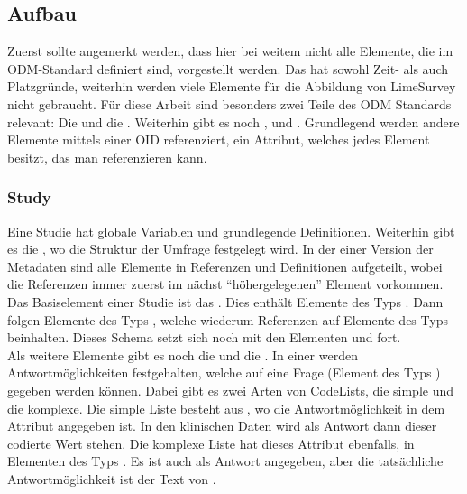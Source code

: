 \subsection{Aufbau}

Zuerst sollte angemerkt werden, dass hier bei weitem nicht alle Elemente, die im ODM-Standard definiert sind, vorgestellt werden. Das hat sowohl Zeit- als auch Platzgründe, weiterhin werden viele Elemente für die Abbildung von LimeSurvey nicht gebraucht.
Für diese Arbeit sind besonders zwei Teile des ODM Standards relevant: Die  und die .
Weiterhin gibt es noch ,  und .
Grundlegend werden andere Elemente mittels einer OID referenziert, ein Attribut, welches jedes Element besitzt, das man referenzieren kann.

\subsubsection{Study}

Eine Studie hat globale Variablen und grundlegende Definitionen.
Weiterhin gibt es die , wo die Struktur der Umfrage festgelegt wird.
In der einer Version der Metadaten sind alle Elemente in Referenzen und Definitionen aufgeteilt, wobei die Referenzen immer zuerst im nächst \enquote{höhergelegenen} Element vorkommen.\\

Das Basiselement einer Studie ist das .
Dies enthält Elemente des Typs .
Dann folgen Elemente des Typs , welche wiederum Referenzen auf Elemente des Typs  beinhalten.
Dieses Schema setzt sich noch mit den Elementen  und  fort.\\

Als weitere Elemente gibt es noch die  und die .
In einer  werden Antwortmöglichkeiten festgehalten, welche auf eine Frage (Element des Typs ) gegeben werden können.
Dabei gibt es zwei Arten von CodeLists, die simple und die komplexe.
Die simple Liste besteht aus , wo die Antwortmöglichkeit in dem Attribut  angegeben ist.
In den klinischen Daten wird als Antwort dann dieser codierte Wert stehen.
Die komplexe Liste hat dieses Attribut ebenfalls, in Elementen des Typs . Es ist auch als Antwort angegeben, aber die tatsächliche Antwortmöglichkeit ist der Text von .

